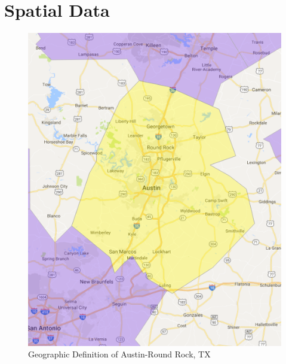 \documentclass[12pt]{article}
\begin{document}
\section{Spatial Data}

\begin{figure}[h]
\begin{centering}
  \includegraphics[width=\textwidth]{Austin}
  \caption{Geographic Definition of Austin-Round Rock, TX}
   \label{fig:Austin}
\end{centering}
\end{figure}
\end{document}
